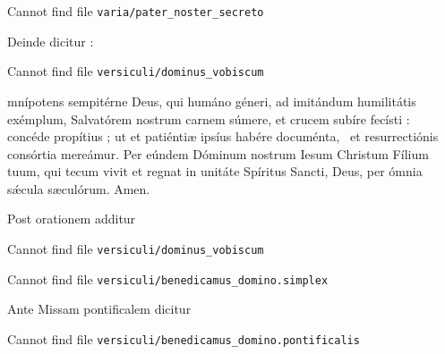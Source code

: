 Cannot find file \verb|varia/pater_noster_secreto|

\begin{rubric}Deinde dicitur :\end{rubric}

Cannot find file \verb|versiculi/dominus_vobiscum|


\begin{lectio}mnípotens sempitérne Deus, qui humáno géneri, ad imitándum humilitátis exémplum, Salvatórem nostrum carnem súmere,
et crucem subíre fecísti :~{\gcrux} concéde propítius ; ut et patiéntiæ ipsíus habére documénta,~{\gstella}
et resurrectiónis consórtia mereámur.
Per eúndem Dóminum nostrum Iesum Christum Fílium tuum,
qui tecum vivit et regnat in unitáte Spíritus Sancti, Deus, per ómnia sǽcula sæculórum.
\R Amen.\end{lectio}

\begin{rubric}Post orationem additur\end{rubric}

Cannot find file \verb|versiculi/dominus_vobiscum|

Cannot find file \verb|versiculi/benedicamus_domino.simplex|

\begin{remplacement}Ante Missam pontificalem dicitur\end{remplacement}

Cannot find file \verb|versiculi/benedicamus_domino.pontificalis|



